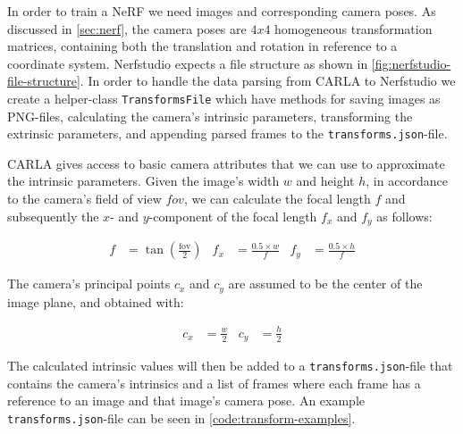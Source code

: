 In order to train a NeRF we need images and corresponding camera poses. As discussed in \autoref{sec:nerf}, the camera poses are $4x4$ homogeneous transformation matrices, containing both the translation and rotation in reference to a coordinate system. Nerfstudio expects a file structure as shown in \autoref{fig:nerfstudio-file-structure}. In order to handle the data parsing from CARLA to Nerfstudio we create a helper-class \texttt{TransformsFile} which have methods for saving images as PNG-files, calculating the camera's intrinsic parameters, transforming the extrinsic parameters, and appending parsed frames to the \texttt{transforms.json}-file.



CARLA gives access to basic camera attributes that we can use to approximate the intrinsic parameters. Given the image's width $w$ and height $h$, in accordance to the camera's field of view $fov$, we can calculate the focal length $f$ and subsequently the $x$- and $y$-component of the focal length $f_x$ and $f_y$ as follows:

\begin{align*}
f &= \tan\left(\frac{\text{fov}}{2}\right) &
f_x &= \frac{0.5 \times w}{f} &
f_y &= \frac{0.5 \times h}{f}
\end{align*}

The camera's principal points $c_x$ and $c_y$ are assumed to be the center of the image plane, and obtained with:

\begin{align*}
c_x &= \frac{w}{2} &
c_y &= \frac{h}{2}
\end{align*}

The calculated intrinsic values will then be added to a \texttt{transforms.json}-file that contains the camera's intrinsics and a list of frames where each frame has a reference to an image and that image's camera pose. An example \texttt{transforms.json}-file can be seen in \autoref{code:transform-examples}.



